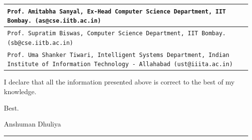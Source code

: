 \documentclass[a4paper,12pt]{article}
\begin{document}
\begin{flushleft}
\begin{tabular}{ m{} M{0.05\textwidth}}
    \rule[13pt]{0ex}{0ex}\texttt{Prof. Amitabha Sanyal, Ex-Head Computer Science Department, IIT Bombay. (as@cse.iitb.ac.in)} & \\ \hline

    \rule[13pt]{0ex}{0ex}\texttt{Prof. Supratim Biswas, Computer Science Department, IIT Bombay. (sb@cse.iitb.ac.in)} & \\ \hline

    \rule[13pt]{0ex}{0ex}\texttt{Prof. Uma Shanker Tiwari, Intelligent Systems Department,
    Indian Institute of Information Technology - Allahabad (ust@iiita.ac.in)} & \\ \hline

\end{tabular}

\vspace{2em}
I declare that all the information presented above is correct
to the best of my knowledge.

\vspace{2em}

Best.

\vspace{2em}
Anshuman Dhuliya


\vspace*{\fill}
\rule[1pt]{\textwidth}{2pt}

\end{flushleft}
\end{document}
